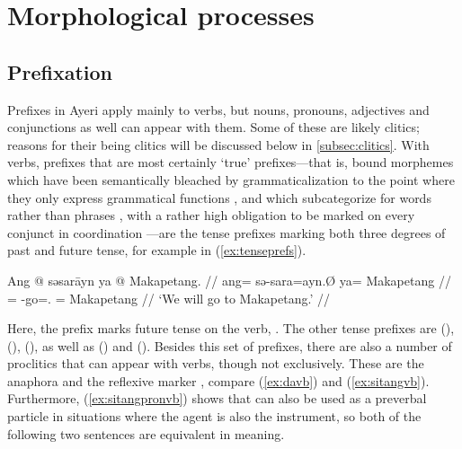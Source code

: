 \section{Morphological processes}

\subsection{Prefixation}

Prefixes in Ayeri apply mainly to verbs, but nouns, pronouns, adjectives and
conjunctions as well can appear with them. Some of these are likely clitics;
reasons for their being clitics will be discussed below in
\autoref{subsec:clitics}. With verbs, prefixes that are most certainly `true'
prefixes---that is, bound morphemes which have been semantically bleached by
grammaticalization to the point where they only express grammatical functions
\citep[157\psqq]{lehmann2015}, and which subcategorize for words rather than
phrases \citep[117]{klavans1985}, with a rather high obligation to be marked on
every conjunct in coordination \citep[139]{spencerluis2012}---are the tense
prefixes marking both three degrees of past and future tense, for example
 in (\ref{ex:tenseprefs}).

\ex\label{ex:tenseprefs}
\begingl
	\gla Ang @ səsarāyn ya @ Makapetang. //
	\glb ang= sə-sara=ayn.Ø ya= Makapetang //
	\glc \AgtT{}= \Fut{}-go=\Fpl{}.\Top{} \Loc{}= Makapetang //
	\glft `We will go to Makapetang.' //
\endgl\xe

Here, the prefix  marks future tense on the verb, 
. The other tense prefixes are 
  (\NPst{}),  (\Pst{}),  (\RPst{}),
as well as  (\NFut{}) and  (\RFut{}). Besides this
set of prefixes, there are also a number of proclitics that can appear with
verbs, though not exclusively. These are the anaphora  and the reflexive marker
, compare (\ref{ex:davb}) and (\ref{ex:sitangvb}).
Furthermore, (\ref{ex:sitangpronvb}) shows that  can also
be used as a preverbal particle in situations where the agent is also the
instrument, so both of the following two sentences are equivalent in meaning.

